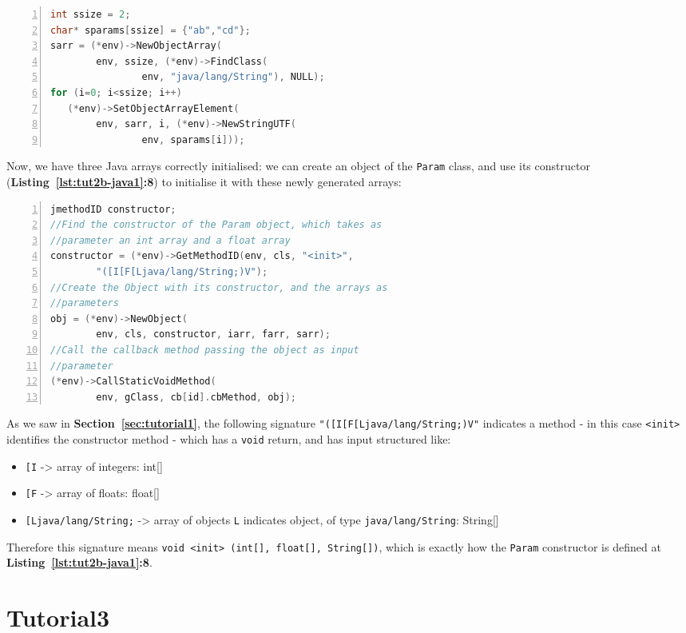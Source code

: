 \documentclass[a4paper,10pt]{article}
\newcommand{\keyword}[1]{\texttt{#1}}
\newcommand{\refl}[1]{\textbf{Listing~\ref{#1}}}
\newcommand{\refs}[1]{\textbf{Section~\ref{#1}}}
\begin{document}
\begin{multicols}{2}
\begin{lstlisting}[language=C,
				   columns=fullflexible,
				   showstringspaces=false,
				   xleftmargin=15pt,
				   frame = l,
				   numbers=left,
				   commentstyle=\color{gray}\upshape]
int ssize = 2;
char* sparams[ssize] = {"ab","cd"};
sarr = (*env)->NewObjectArray(
		env, ssize, (*env)->FindClass(
				env, "java/lang/String"), NULL);
for (i=0; i<ssize; i++)
   (*env)->SetObjectArrayElement(
   		env, sarr, i, (*env)->NewStringUTF(
   				env, sparams[i]));
\end{lstlisting}
Now, we have three Java arrays correctly initialised: we can create an object of the \keyword{Param} class, and use its constructor (\refl{lst:tut2b-java1}\textbf{:8}) to initialise it with these newly generated arrays:
\begin{lstlisting}[language=C,
				   columns=fullflexible,
				   showstringspaces=false,
				   xleftmargin=15pt,
				   frame = l,
				   numbers=left,
				   commentstyle=\color{gray}\upshape]
jmethodID constructor;
//Find the constructor of the Param object, which takes as
//parameter an int array and a float array
constructor = (*env)->GetMethodID(env, cls, "<init>",
		"([I[F[Ljava/lang/String;)V");
//Create the Object with its constructor, and the arrays as
//parameters
obj = (*env)->NewObject(
		env, cls, constructor, iarr, farr, sarr);
//Call the callback method passing the object as input
//parameter
(*env)->CallStaticVoidMethod(
		env, gClass, cb[id].cbMethod, obj);
\end{lstlisting}
As we saw in \refs{sec:tutorial1}, the following signature \keyword{"([I[F[Ljava/lang/String;)V"} indicates a method - in this case \keyword{<init>} identifies the constructor method - which has a \keyword{void} return, and has input structured like:
\begin{itemize}
\item \keyword{[I} -> array of integers: int[]
\item \keyword{[F} -> array of floats: float[]
\item \keyword{[Ljava/lang/String;} -> array of objects \keyword{L} indicates object, of type \keyword{java/lang/String}: String[]
\end{itemize}
Therefore this signature means \keyword{void <init> (int[], float[], String[])}, which is exactly how the \keyword{Param} constructor is defined at \refl{lst:tut2b-java1}\textbf{:8}.


\section{Tutorial3}


\end{multicols}
\end{document}
